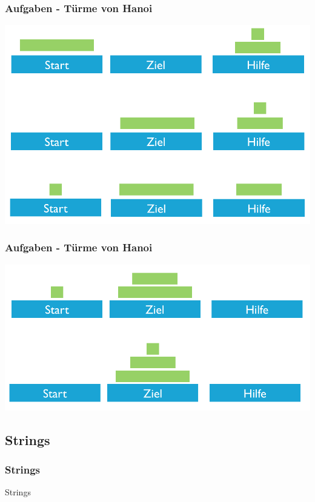 \begin{frame}
	\frametitle{Aufgaben - Türme von Hanoi}
	\center
	\includegraphics[width=1\textwidth, keepaspectratio=true]{bilder/hanoi2.png}
\end{frame}

\begin{frame}
	\frametitle{Aufgaben - Türme von Hanoi}
	\center
	\includegraphics[width=1\textwidth, keepaspectratio=true]{bilder/hanoi3.png}
\end{frame}

\subsection{Strings}
\begin{frame}[fragile]
	\frametitle{Strings}
	\huge Strings
\end{frame}

